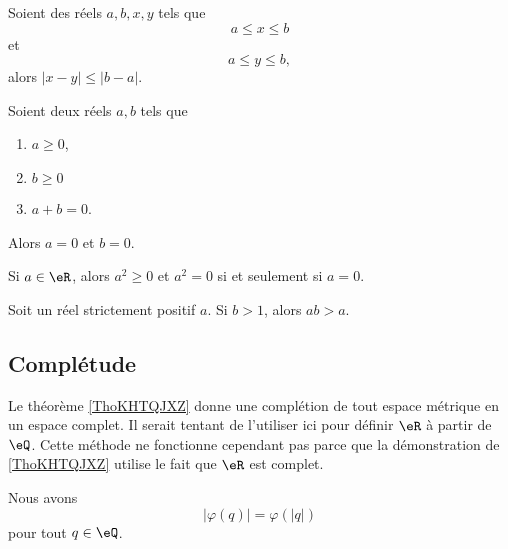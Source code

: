 \begin{lemma}        \label{LEMooEGYLooCGrDrl}
	Soient des réels \( a,b,x,y\) tels que
	\begin{equation}
		a\leq x\leq b
	\end{equation}
	et
	\begin{equation}
		a\leq y\leq b,
	\end{equation}
	alors \( | x-y |\leq | b-a |\).
\end{lemma}

\begin{lemma}       \label{LEMooTPLUooXiCZHJ}
	Soient deux réels \( a,b\) tels que
	\begin{enumerate}
		\item
		      \( a\geq 0\),
		\item
		      \( b\geq 0\)
		\item
		      \( a+b=0\).
	\end{enumerate}
	Alors \( a=0\) et \( b=0\).
\end{lemma}

\begin{lemma}       \label{LEMooNLGSooSGdvAo}
	Si \( a\in \eR\), alors \( a^2\geq 0\) et \( a^2=0\) si et seulement si \( a=0\).
\end{lemma}

\begin{lemma}       \label{LEMooVXAXooNhxtSU}
	Soit un réel strictement positif \( a\). Si \( b>1\), alors \( ab>a\).
\end{lemma}


\subsection{Complétude}

Le théorème \ref{ThoKHTQJXZ} donne une complétion de tout espace métrique en un espace complet. Il serait tentant de l'utiliser ici pour définir \( \eR\) à partir de \( \eQ\). Cette méthode ne fonctionne cependant pas parce que la démonstration de \ref{ThoKHTQJXZ} utilise le fait que \( \eR\) est complet.

\begin{lemma}       \label{LEMooXCVRooOSZYWv}
	Nous avons
	\begin{equation}
		| \varphi(q) |= \varphi(| q |)
	\end{equation}
	pour tout \( q\in \eQ\).
\end{lemma}

